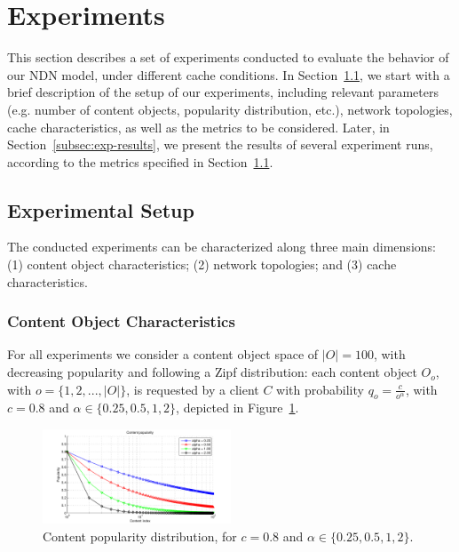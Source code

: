 \section{Experiments}
\label{sec:experiments}

This section describes a set of experiments conducted to evaluate 
the behavior of our NDN model, under different cache conditions. In 
Section~\ref{subsec:exp-setup}, we start 
with a brief description of the setup of our experiments, 
including relevant parameters (e.g. number of content objects, popularity 
distribution, etc.), network topologies, cache characteristics, as well as the 
metrics to be considered. Later, in Section~\ref{subsec:exp-results}, we 
present the results of several experiment runs, according to the metrics 
specified in Section~\ref{subsec:exp-setup}.

\subsection{Experimental Setup}
\label{subsec:exp-setup}

The conducted experiments can be characterized along three main dimensions: (1) 
content object characteristics; (2) network topologies; and (3) cache 
characteristics.\shortvertbreak

\subsubsection{Content Object Characteristics}
\label{subsec:exp-setup-cobj}

For all experiments we consider a content object space of 
$|O| = 100$, with decreasing popularity and following a Zipf distribution: 
each content object $O_o$, with $o = \{1,2,...,|O|\}$, is requested by a client 
$C$ with probability $q_{o} = \frac{c}{o^{\alpha}}$, with $c = 0.8$ and 
$\alpha \in \{0.25, 0.5, 1, 2\}$, depicted in Figure~\ref{fig:zipf}.\shortvertbreak

\begin{figure}[h!]

    \centering
    \includegraphics[width=0.50\textwidth]{figures/pop.pdf}
    \cprotect\caption{Content popularity distribution, for $c = 0.8$ and 
        $\alpha \in \{0.25, 0.5, 1, 2\}$.}
    \label{fig:zipf}

\end{figure}

